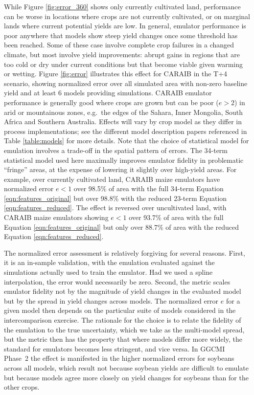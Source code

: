 \documentclass[gmdd]{copernicus} %
\begin{document}
While Figure \ref{fig:error_360} shows only currently cultivated land, performance can be worse in locations where crops are not currently cultivated, or on marginal lands where current potential yields are low. In general, emulator performance is poor anywhere that models show steep yield changes once some threshold has been reached. Some of these case involve complete crop failures in a changed climate, but most involve yield improvements: abrupt gains in regions that are too cold or dry under current conditions but that become viable given warming or wetting.
Figure \ref{fig:error} illustrates this effect for CARAIB in the T+4 scenario, showing normalized error over all simulated area with non-zero baseline yield and at least 6 models providing simulations. CARAIB emulator performance is generally good where crops are grown but can be poor ($e > 2$) in arid or mountainous zones, e.g.\ the edges of the Sahara, Inner Mongolia, South Africa and Southern Australia. %
Effects will vary by crop model as they differ in process implementations; see the different model description papers referenced in Table \ref{table:models} for more details.
Note that the choice of statistical model for emulation involves a trade-off in the spatial pattern of errors. The 34-term statistical model used here maximally improves emulator fidelity in problematic ``fringe'' areas, at the expense of lowering it slightly over high-yield areas.
For example, over currently cultivated land, CARAIB maize emulators have normalized error $e < 1$ over 98.5\% of area with the full 34-term Equation \ref{eqn:features_original} but over 98.8\% with the reduced 23-term Equation \ref{eqn:features_reduced}. 
The effect is reversed over uncultivated land, with CARAIB maize emulators showing $e < 1$ over 93.7\% of area with the full Equation \ref{eqn:features_original} but only over 88.7\% of area with the reduced Equation \ref{eqn:features_reduced}.  

The normalized error assessment is relatively forgiving for several reasons. 
First, it is an in-sample validation, with the emulation evaluated against the simulations actually used to train the emulator. 
Had we used a spline interpolation, the error would necessarily be zero. 
Second, the metric scales emulator fidelity not by the magnitude of yield changes in the evaluated model but by the spread in yield changes across models. 
The normalized error $e$ for a given model then depends on the particular suite of models considered in the intercomparison exercise.  
The rationale for the choice is to relate the fidelity of the emulation to the true uncertainty, which we take as the multi-model spread, but  
the metric then has the property that where models differ more widely, the standard for emulators becomes less stringent, and vice versa.
In GGCMI Phase~2 the effect is manifested in the higher normalized errors for soybeans across all models, which result not because soybean yields are difficult to emulate but because models agree more closely on yield changes for soybeans than for the other crops.
\end{document}
